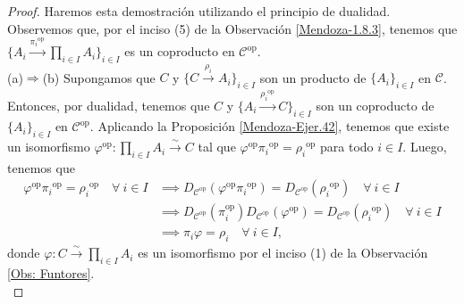 \documentclass[tesis]{subfiles}
\begin{document}
\begin{proof}

    Haremos esta demostración utilizando el principio de dualidad. Observemos que, por el inciso (5) de la Observación \ref{Mendoza-1.8.3}, tenemos que $\{A_i\xrightarrow[]{\pi_i{}^\text{op}} \prod_{i\in I}A_i\}_{i\in I}$ es un coproducto en $\mathscr{C}^\text{op}$. \\

    (a)$\Rightarrow$(b) Supongamos que $C$ y $\{C\xrightarrow[]{\rho_i} A_i\}_{i\in I}$ son un producto de $\{A_i\}_{i\in I}$ en $\mathscr{C}$. Entonces, por dualidad, tenemos que $C$ y $\{A_i\xrightarrow[]{\rho_i{}^\text{op}} C\}_{i\in I}$ son un coproducto de $\{A_i\}_{i\in I}$ en $\mathscr{C}^\text{op}$. Aplicando la Proposición \ref{Mendoza-Ejer.42}, tenemos que existe un isomorfismo $\varphi^\text{op}:\prod_{i\in I}A_i\xrightarrow[]{\sim}C$ tal que $\varphi^\text{op}\pi_i{}^\text{op}=\rho_i{}^\text{op}$ para todo $i\in I$. Luego, tenemos que
    \begin{align*}
        \varphi^\text{op}\pi_i{}^\text{op}=\rho_i{}^\text{op} \quad \forall \ i\in I &\implies D_{\mathscr{C}^\text{op}}(\varphi^\text{op}\pi_i{}^\text{op}) = D_{\mathscr{C}^\text{op}}(\rho_i{}^\text{op}) \quad \forall \ i\in I \\
                                                                                     &\implies D_{\mathscr{C}^\text{op}}(\pi_i^\text{op})D_{\mathscr{C}^\text{op}}(\varphi^\text{op}) = D_{\mathscr{C}^\text{op}}(\rho_i{}^\text{op}) \quad \forall \ i\in I \\
                                                                                     &\implies \pi_i\varphi = \rho_i \quad \forall \ i\in I,
    \end{align*}
    donde $\varphi:C\xrightarrow[]{\sim}\prod_{i\in I}A_i$ es un isomorfismo por el inciso (1) de la Observación \ref{Obs: Funtores}. \\


\end{proof}
\end{document}

